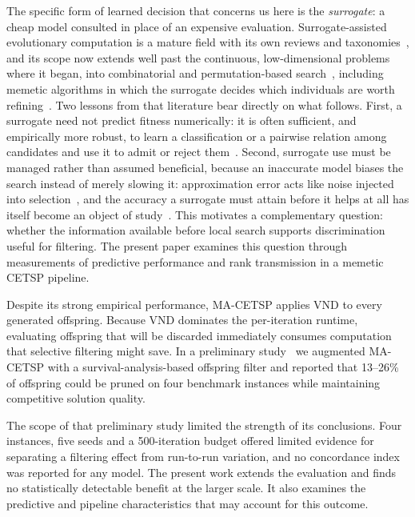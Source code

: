 \documentclass[a4paper,fleqn]{cas-dc}
\begin{document}
The specific form of learned decision that concerns us here is the
\emph{surrogate}: a cheap model consulted in place of an expensive evaluation.
Surrogate-assisted evolutionary computation is a mature field with its own
reviews and taxonomies~\citep{jin2005comprehensive,he2023review}, and its scope
now extends well past the continuous, low-dimensional problems where it began,
into combinatorial and permutation-based
search~\citep{liu2024combinatorial}, including memetic algorithms in which the
surrogate decides which individuals are worth
refining~\citep{nishihara2025memetic}. Two lessons from that literature bear
directly on what follows. First, a surrogate need not predict fitness
numerically: it is often sufficient, and empirically more robust, to learn a
classification or a pairwise relation among candidates and use it to admit or
reject them~\citep{li2022classification,hao2024unevaluated}. Second, surrogate
use must be managed rather than assumed beneficial, because an inaccurate model
biases the search instead of merely slowing it: approximation error acts like
noise injected into selection~\citep{zheng2024noise}, and the accuracy a
surrogate must attain before it helps at all has itself become an object of
study~\citep{hanawa2025impact}. This motivates a complementary question: whether
the information available before local search supports discrimination useful
for filtering. The present paper examines this question through measurements of
predictive performance and rank transmission in a memetic CETSP pipeline.

Despite its strong empirical performance, MA-CETSP applies VND
to every generated offspring. Because VND dominates the per-iteration runtime,
evaluating offspring that will be discarded immediately consumes computation
that selective filtering might save. In a preliminary
study~\citep{balemir2026lacetsp} we augmented MA-CETSP with a
survival-analysis-based offspring filter and reported that 13--26\% of offspring
could be pruned on four benchmark instances while maintaining competitive
solution quality.

The scope of that preliminary study limited the strength of its conclusions.
Four instances, five seeds and a 500-iteration budget offered limited evidence
for separating a filtering effect from run-to-run variation, and no concordance
index was reported for any model. The present work extends the evaluation and
finds no statistically detectable benefit at the larger scale. It also examines
the predictive and pipeline characteristics that may account for this outcome.
\end{document}
